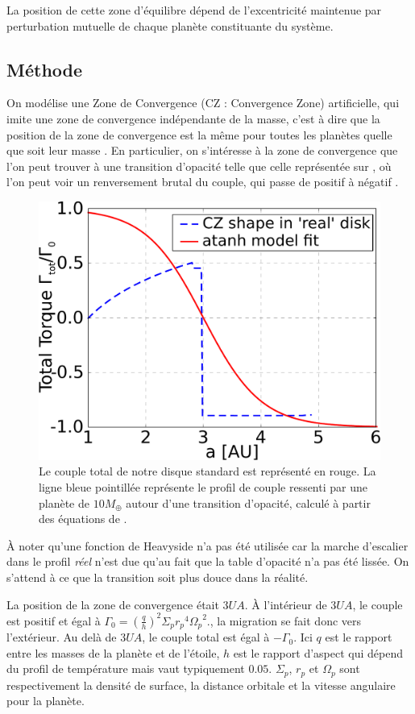 La position de cette zone d'équilibre dépend de l'excentricité maintenue par perturbation mutuelle de chaque planète constituante du système.

\subsection{Méthode}
On modélise une Zone de Convergence (CZ : Convergence Zone) artificielle, qui imite une zone de convergence indépendante de la masse, c'est à dire que la position de la zone de convergence est la même pour toutes les planètes quelle que soit leur masse . En particulier, on s'intéresse à la zone de convergence que l'on peut trouver à une transition d'opacité telle que celle représentée sur , où l'on peut voir un renversement brutal du couple, qui passe de positif à négatif \citep[voir par exemple ][]{masset2011type}.

\begin{figure}[htbp]
\centering
\includegraphics[width=0.49\linewidth]{figure/shifted/torque_zoom_CZ1.pdf}
\caption{Le couple total de notre disque standard est représenté en rouge. La ligne bleue pointillée représente le profil de couple ressenti par une planète de $10\unit{M_\oplus}$ autour d'une transition d'opacité, calculé à partir des équations de \cite{paardekooper2011torque}.}\label{fig:shifted_CZ_torque_prof}
\end{figure}

À noter qu'une fonction de Heavyside n'a pas été utilisée car la marche d'escalier dans le profil \textit{réel} n'est due qu'au fait que la table d'opacité n'a pas été lissée. On s'attend à ce que la transition soit plus douce dans la réalité.

La position de la zone de convergence était $3\unit{UA}$. À l'intérieur de $3\unit{UA}$, le couple est positif et égal à $\Gamma_0 = \left(\frac{q}{h}\right)^2\Sigma_p {r_p}^4 {\Omega_p}^2$., la migration se fait donc vers l'extérieur. Au delà de $3\unit{UA}$, le couple total est égal à $-\Gamma_0$. Ici $q$ est le rapport entre les masses de la planète et de l'étoile, $h$ est le rapport d'aspect qui dépend du profil de température mais vaut typiquement $0.05$. $\Sigma_p$, $r_p$ et $\Omega_p$ sont respectivement la densité de surface, la distance orbitale et la vitesse angulaire pour la planète. 

